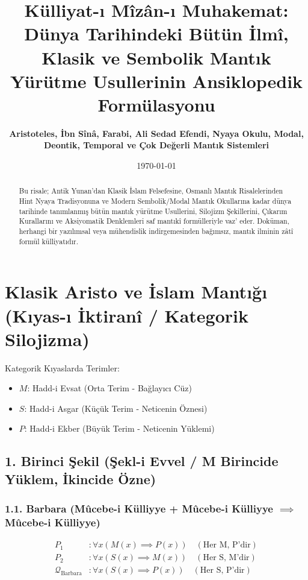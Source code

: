 \documentclass[11pt, a4paper]{article}
\title{\textbf{Külliyat-ı Mîzân-ı Muhakemat: Dünya Tarihindeki Bütün İlmî, Klasik ve Sembolik Mantık Yürütme Usullerinin Ansiklopedik Formülasyonu}}
\author{\textbf{Aristoteles, İbn Sînâ, Farabi, Ali Sedad Efendi, Nyaya Okulu, Modal, Deontik, Temporal ve Çok Değerli Mantık Sistemleri}}
\date{\today}
\begin{document}
\maketitle

\begin{abstract}
Bu risale; Antik Yunan'dan Klasik İslam Felsefesine, Osmanlı Mantık Risalelerinden Hint Nyaya Tradisyonuna ve Modern Sembolik/Modal Mantık Okullarına kadar dünya tarihinde tanımlanmış bütün mantık yürütme Usullerini, Silojizm Şekillerini, Çıkarım Kurallarını ve Aksiyomatik Denklemleri saf mantıkî formülleriyle vaz' eder. Doküman, herhangi bir yazılımsal veya mühendislik indirgemesinden bağımsız, mantık ilminin zâtî formül külliyatıdır.
\end{abstract}

\tableofcontents
\newpage

\section{Klasik Aristo ve İslam Mantığı (Kıyas-ı İktiranî / Kategorik Silojizma)}

Kategorik Kıyaslarda Terimler:
\begin{itemize}
    \item $M$: Hadd-i Evsat (Orta Terim - Bağlayıcı Cüz)
    \item $S$: Hadd-i Asgar (Küçük Terim - Neticenin Öznesi)
    \item $P$: Hadd-i Ekber (Büyük Terim - Neticenin Yüklemi)
\end{itemize}

\subsection{1. Birinci Şekil (Şekl-i Evvel / M Birincide Yüklem, İkincide Özne)}

\subsubsection{1.1. Barbara (Mûcebe-i Külliyye + Mûcebe-i Külliyye $\implies$ Mûcebe-i Külliyye)}
\begin{align}
P_1 &: \forall x (M(x) \implies P(x)) \quad (\text{Her M, P'dir}) \\
P_2 &: \forall x (S(x) \implies M(x)) \quad (\text{Her S, M'dir}) \\
\mathcal{Q}_{\text{Barbara}} &: \forall x (S(x) \implies P(x)) \quad (\text{Her S, P'dir})
\end{align}
\end{document}
